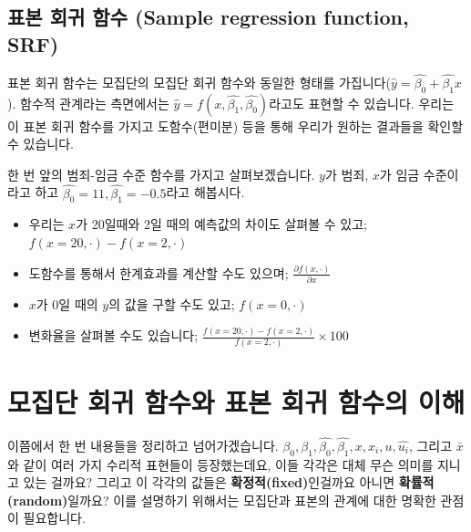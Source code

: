 \documentclass[
]{book}
\begin{document}
\hypertarget{uxd45cuxbcf8-uxd68cuxadc0-uxd568uxc218-sample-regression-function-srf}{%
\subsection{표본 회귀 함수 (Sample regression function, SRF)}\label{uxd45cuxbcf8-uxd68cuxadc0-uxd568uxc218-sample-regression-function-srf}}

표본 회귀 함수는 모집단의 모집단 회귀 함수와 동일한 형태를 가집니다(\(\hat{y}=\hat{\beta_0}+\hat{\beta_1}x\)). 함수적 관계라는 측면에서는 \(\hat{y} = f(x, \hat{\beta_1}, \hat{\beta_0})\)라고도 표현할 수 있습니다. 우리는 이 표본 회귀 함수를 가지고 도함수(편미분) 등을 통해 우리가 원하는 결과들을 확인할 수 있습니다.

한 번 앞의 범죄-임금 수준 함수를 가지고 살펴보겠습니다. \(y\)가 범죄, \(x\)가 임금 수준이라고 하고 \(\hat{\beta_0}=11, \hat{\beta_1}=-0.5\)라고 해봅시다.

\begin{itemize}
\item
  우리는 \(x\)가 20일때와 2일 때의 예측값의 차이도 살펴볼 수 있고; \(f(x=20, \cdot) - f(x = 2, \cdot)\)
\item
  도함수를 통해서 한계효과를 계산할 수도 있으며; \(\frac{\partial f(x, \cdot)}{\partial x}\)
\item
  \(x\)가 0일 때의 \(y\)의 값을 구할 수도 있고; \(f(x = 0, \cdot)\)
\item
  변화율을 살펴볼 수도 있습니다; \(\frac{f(x=20, \cdot) - f(x = 2, \cdot)}{f(x = 2, \cdot)}\times100\)
\end{itemize}

\hypertarget{uxbaa8uxc9d1uxb2e8-uxd68cuxadc0-uxd568uxc218uxc640-uxd45cuxbcf8-uxd68cuxadc0-uxd568uxc218uxc758-uxc774uxd574}{%
\section{모집단 회귀 함수와 표본 회귀 함수의 이해}\label{uxbaa8uxc9d1uxb2e8-uxd68cuxadc0-uxd568uxc218uxc640-uxd45cuxbcf8-uxd68cuxadc0-uxd568uxc218uxc758-uxc774uxd574}}

이쯤에서 한 번 내용들을 정리하고 넘어가겠습니다. \(\beta_0, \beta_1, \hat{\beta_0}, \hat{\beta_1}, x, x_i, u, \hat{u_i}\), 그리고 \(\bar{x}\)와 같이 여러 가지 수리적 표현들이 등장했는데요, 이들 각각은 대체 무슨 의미를 지니고 있는 걸까요? 그리고 이 각각의 값들은 \textbf{확정적(fixed)}인걸까요 아니면 \textbf{확률적(random)}일까요? 이를 설명하기 위해서는 모집단과 표본의 관계에 대한 명확한 관점이 필요합니다.
\end{document}
